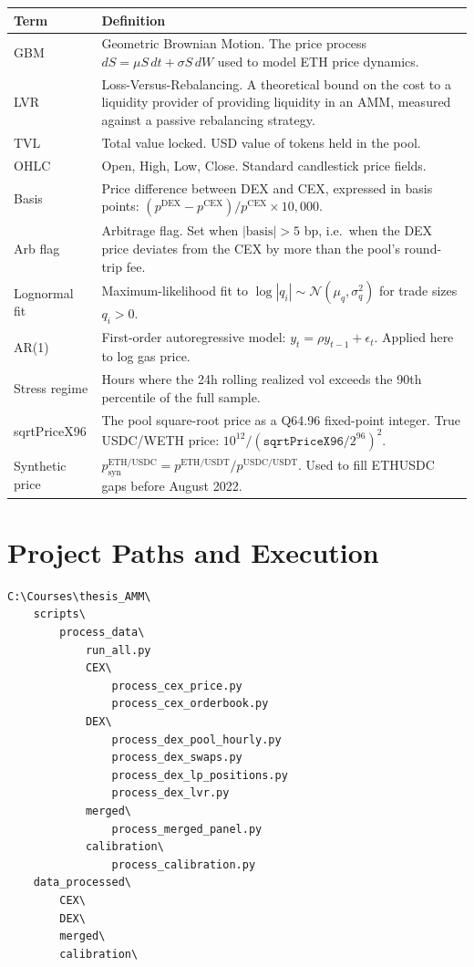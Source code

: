 \documentclass[11pt,a4paper]{article}
\begin{document}
\begin{xltabular}{\linewidth}{L{3.0cm}Y}
\toprule
\textbf{Term} & \textbf{Definition} \\
\midrule
GBM & Geometric Brownian Motion. The price process $dS = \mu S\,dt +
      \sigma S\,dW$ used to model ETH price dynamics. \\
LVR & Loss-Versus-Rebalancing. A theoretical bound on the cost to a
      liquidity provider of providing liquidity in an AMM, measured
      against a passive rebalancing strategy. \\
TVL & Total value locked. USD value of tokens held in the pool. \\
OHLC & Open, High, Low, Close. Standard candlestick price fields. \\
Basis & Price difference between DEX and CEX, expressed in basis points:
        $(p^{\mathrm{DEX}} - p^{\mathrm{CEX}}) / p^{\mathrm{CEX}} \times
        10{,}000$. \\
Arb flag & Arbitrage flag. Set when $|\text{basis}| > 5$ bp, i.e.\ when
           the DEX price deviates from the CEX by more than the pool's
           round-trip fee. \\
Lognormal fit & Maximum-likelihood fit to $\log |q_i| \sim
                \mathcal{N}(\mu_q, \sigma_q^2)$ for trade sizes $q_i > 0$. \\
AR(1) & First-order autoregressive model: $y_t = \rho y_{t-1} + \epsilon_t$.
        Applied here to log gas price. \\
Stress regime & Hours where the 24h rolling realized vol exceeds the 90th
                percentile of the full sample. \\
sqrtPriceX96 & The pool square-root price as a Q64.96 fixed-point integer.
               True USDC/WETH price: $10^{12} / (\texttt{sqrtPriceX96} /
               2^{96})^2$. \\
Synthetic price & $p^{\mathrm{ETH/USDC}}_{\mathrm{syn}} =
                  p^{\mathrm{ETH/USDT}} / p^{\mathrm{USDC/USDT}}$.
                  Used to fill ETHUSDC gaps before August 2022. \\
\bottomrule
\end{xltabular}

\section{Project Paths and Execution}
\label{sec:paths}

\begin{lstlisting}
C:\Courses\thesis_AMM\
    scripts\
        process_data\
            run_all.py
            CEX\
                process_cex_price.py
                process_cex_orderbook.py
            DEX\
                process_dex_pool_hourly.py
                process_dex_swaps.py
                process_dex_lp_positions.py
                process_dex_lvr.py
            merged\
                process_merged_panel.py
            calibration\
                process_calibration.py
    data_processed\
        CEX\
        DEX\
        merged\
        calibration\
\end{lstlisting}
\end{document}
